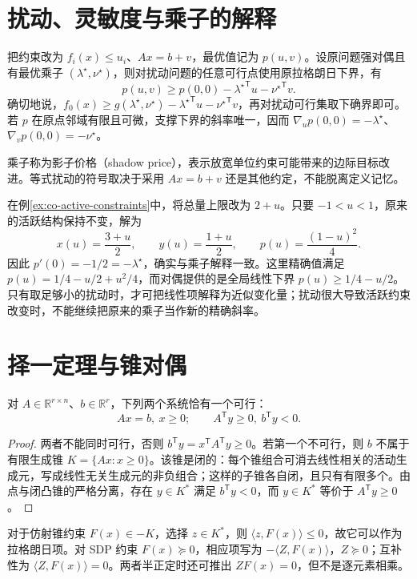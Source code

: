 \section{扰动、灵敏度与乘子的解释}

把约束改为 $f_i(x)\leq u_i$、$Ax=b+v$，最优值记为 $p(u,v)$。设原问题强对偶且有最优乘子 $(\lambda^\star,\nu^\star)$，则对扰动问题的任意可行点使用原拉格朗日下界，有
\begin{equation}
 p(u,v)\geq p(0,0)-{\lambda^\star}^{\mathsf T}u-{\nu^\star}^{\mathsf T}v.
 \label{eq:co-sensitivity-bound}
\end{equation}
确切地说，$f_0(x)\geq g(\lambda^\star,\nu^\star)-{\lambda^\star}^{\mathsf T}u-{\nu^\star}^{\mathsf T}v$，再对扰动可行集取下确界即可。若 $p$ 在原点邻域有限且可微，支撑下界的斜率唯一，因而 $\nabla_up(0,0)=-\lambda^\star$、$\nabla_vp(0,0)=-\nu^\star$。

乘子称为影子价格（shadow price），表示放宽单位约束可能带来的边际目标改进。等式扰动的符号取决于采用 $Ax=b+v$ 还是其他约定，不能脱离定义记忆。

在例\ref{ex:co-active-constraints}中，将总量上限改为 $2+u$。只要 $-1<u<1$，原来的活跃结构保持不变，解为
\[
 x(u)=\frac{3+u}{2},\qquad y(u)=\frac{1+u}{2},\qquad
 p(u)=\frac{(1-u)^2}{4}.
\]
因此 $p'(0)=-1/2=-\lambda^\star$，确实与乘子解释一致。这里精确值满足 $p(u)=1/4-u/2+u^2/4$，而对偶提供的是全局线性下界 $p(u)\geq1/4-u/2$。只有取足够小的扰动时，才可把线性项解释为近似变化量；扰动很大导致活跃约束改变时，不能继续把原来的乘子当作新的精确斜率。

\section{择一定理与锥对偶}

\begin{theorem}[Farkas 引理]
对 $A\in\mathbb R^{r\times n}$、$b\in\mathbb R^r$，下列两个系统恰有一个可行：
\[
 Ax=b,\ x\geq0;\qquad A^{\mathsf T}y\geq0,\ b^{\mathsf T}y<0.
\]
\end{theorem}
\begin{proof}
两者不能同时可行，否则 $b^{\mathsf T}y=x^{\mathsf T}A^{\mathsf T}y\geq0$。若第一个不可行，则 $b$ 不属于有限生成锥 $K=\{Ax:x\geq0\}$。该锥是闭的：每个锥组合可消去线性相关的活动生成元，写成线性无关生成元的非负组合；这样的子锥各自闭，且只有有限多个。由点与闭凸锥的严格分离，存在 $y\in K^*$ 满足 $b^{\mathsf T}y<0$，而 $y\in K^*$ 等价于 $A^{\mathsf T}y\geq0$。
\end{proof}

对于仿射锥约束 $F(x)\in-K$，选择 $z\in K^*$，则 $\langle z,F(x)\rangle\leq0$，故它可以作为拉格朗日项。对 SDP 约束 $F(x)\succeq0$，相应项写为 $-\langle Z,F(x)\rangle$，$Z\succeq0$；互补性为 $\langle Z,F(x)\rangle=0$。两者半正定时还可推出 $ZF(x)=0$，但不是逐元素相乘。

